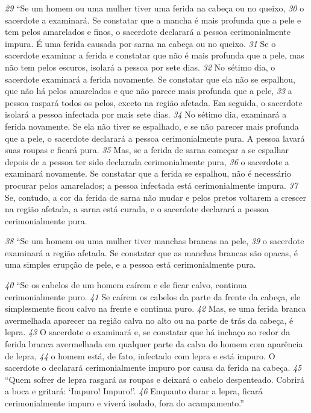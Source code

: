\bigskip 
\textit{\tiny 29}
“Se um homem ou uma mulher tiver uma ferida na cabeça ou no queixo, 
\textit{\tiny 30}
o
sacerdote a examinará. Se constatar que a mancha é mais profunda que a pele e
tem pelos amarelados e finos, o sacerdote declarará a pessoa cerimonialmente
impura. É uma ferida causada por sarna na cabeça ou no queixo. 
\textit{\tiny 31}
Se o sacerdote
examinar a ferida e constatar que não é mais profunda que a pele, mas não tem
pelos escuros, isolará a pessoa por sete dias. 
\textit{\tiny 32}
No sétimo dia, o sacerdote
examinará a ferida novamente. Se constatar que ela não se espalhou, que não há
pelos amarelados e que não parece mais profunda que a pele, 
\textit{\tiny 33}
a pessoa raspará
todos os pelos, exceto na região afetada. Em seguida, o sacerdote isolará a pessoa
infectada por mais sete dias. 
\textit{\tiny 34}
No sétimo dia, examinará a ferida novamente. Se
ela não tiver se espalhado, e se não parecer mais profunda que a pele, o sacerdote
declarará a pessoa cerimonialmente pura. A pessoa lavará suas roupas e ficará
pura. 
\textit{\tiny 35}
Mas, se a ferida de sarna começar a se espalhar depois de a pessoa ter sido
declarada cerimonialmente pura, 
\textit{\tiny 36}
o sacerdote a examinará novamente. Se
constatar que a ferida se espalhou, não é necessário procurar pelos amarelados; a
pessoa infectada está cerimonialmente impura. 
\textit{\tiny 37}
Se, contudo, a cor da ferida de
sarna não mudar e pelos pretos voltarem a crescer na região afetada, a sarna está
curada, e o sacerdote declarará a pessoa cerimonialmente pura.
   
\bigskip 
\textit{\tiny 38}
“Se um homem ou uma mulher tiver manchas brancas na pele, 
\textit{\tiny 39}
o sacerdote
examinará a região afetada. Se constatar que as manchas brancas são opacas, é
uma simples erupção de pele, e a pessoa está cerimonialmente pura.
   
\bigskip 
\textit{\tiny 40}
“Se os cabelos de um homem caírem e ele ficar calvo, continua
cerimonialmente puro. 
\textit{\tiny 41}
Se caírem os cabelos da parte da frente da cabeça, ele
simplesmente ficou calvo na frente e continua puro. 
\textit{\tiny 42}
Mas, se uma ferida branca
avermelhada aparecer na região calva no alto ou na parte de trás da cabeça, é
lepra. 
\textit{\tiny 43}
O sacerdote o examinará e, se constatar que há inchaço ao redor da ferida
branca avermelhada em qualquer parte da calva do homem com aparência de
lepra, 
\textit{\tiny 44}
o homem está, de fato, infectado com lepra e está impuro. O sacerdote o
declarará cerimonialmente impuro por causa da ferida na cabeça.
\textit{\tiny 45}
“Quem sofrer de lepra rasgará as roupas e deixará o cabelo despenteado.
Cobrirá a boca e gritará: ‘Impuro! Impuro!’. 
\textit{\tiny 46}
Enquanto durar a lepra, ficará
cerimonialmente impuro e viverá isolado, fora do acampamento.”


